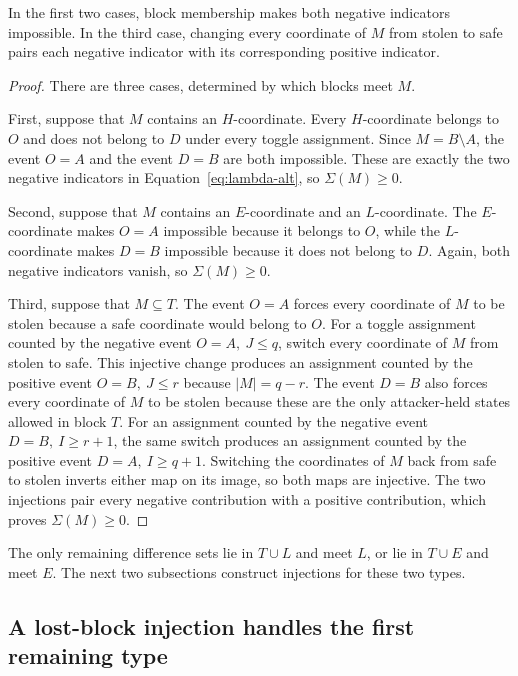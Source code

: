 \documentclass[11pt]{article}
\begin{document}
In the first two cases, block membership makes both negative indicators impossible.
In the third case, changing every coordinate of $M$ from stolen to safe pairs each negative indicator with its corresponding positive indicator.

\begin{proof}
There are three cases, determined by which blocks meet $M$.

First, suppose that $M$ contains an $H$-coordinate.
Every $H$-coordinate belongs to $O$ and does not belong to $D$ under every toggle assignment.
Since ${M=B\setminus A}$, the event ${O=A}$ and the event ${D=B}$ are both impossible.
These are exactly the two negative indicators in Equation~\eqref{eq:lambda-alt}, so ${\Sigma(M)\geq0}$.

Second, suppose that $M$ contains an $E$-coordinate and an $L$-coordinate.
The $E$-coordinate makes ${O=A}$ impossible because it belongs to $O$, while the $L$-coordinate makes ${D=B}$ impossible because it does not belong to $D$.
Again, both negative indicators vanish, so ${\Sigma(M)\geq0}$.

Third, suppose that $M\subseteq T$.
The event ${O=A}$ forces every coordinate of $M$ to be stolen because a safe coordinate would belong to $O$.
For a toggle assignment counted by the negative event ${O=A,\ J\leq q}$, switch every coordinate of $M$ from stolen to safe.
This injective change produces an assignment counted by the positive event ${O=B,\ J\leq r}$ because ${|M|=q-r}$.
The event ${D=B}$ also forces every coordinate of $M$ to be stolen because these are the only attacker-held states allowed in block $T$.
For an assignment counted by the negative event ${D=B,\ I\geq r+1}$, the same switch produces an assignment counted by the positive event ${D=A,\ I\geq q+1}$.
Switching the coordinates of $M$ back from safe to stolen inverts either map on its image, so both maps are injective.
The two injections pair every negative contribution with a positive contribution, which proves ${\Sigma(M)\geq0}$.
\end{proof}

The only remaining difference sets lie in $T\cup L$ and meet $L$, or lie in $T\cup E$ and meet $E$.
The next two subsections construct injections for these two types.

    \subsection{A lost-block injection handles the first remaining type}\label{subsec:lost-injection}
\end{document}
